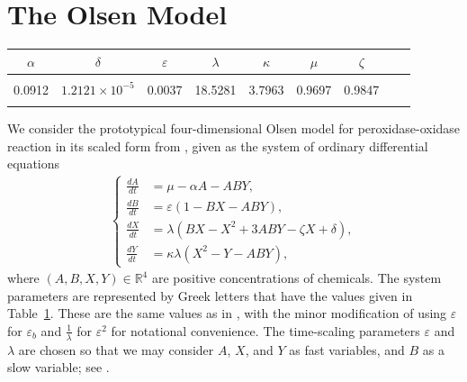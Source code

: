 \documentclass{ws-ijbc}
\begin{document}
\section{The Olsen Model}
\label{sec:olsen}
%
\begin{table}[t!]
{\begin{tabular}{c  c  c  c  c  c  c  c  c} \\[-2pt]
\toprule
$\alpha$ & $\delta$ & $\varepsilon$ & $\lambda$ & $\kappa$ & $\mu$ & $\zeta$ \\[6pt]
\hline\\[-6pt]
0.0912 & $1.2121 \times 10^{-5}$ & 0.0037 & 18.5281 & 3.7963 & 0.9697 & 0.9847\\[1pt]
\botrule
\end{tabular}}
\label{table:pars}
\end{table}
 
We consider the prototypical four-dimensional Olsen model for peroxidase-oxidase reaction \cite{Olsen} in its scaled form from \cite{Rescaling}, given as the system of ordinary differential equations
%
\begin{equation}
\begin{aligned}
\begin{cases}
\frac{dA}{dt} &= \mu - \alpha A - ABY, \\[1mm]
\frac{dB}{dt} &= \varepsilon(1-BX - ABY), \\[1mm]
\frac{dX}{dt} &= \lambda(BX - X^2 +3ABY - \zeta X + \delta), \\[1mm]
\frac{dY}{dt} &= \kappa\lambda(X^2 - Y - ABY),
\end{cases}
\end{aligned}
\label{equation_1}
\end{equation}
%
where $(A, B, X, Y)\in\mathbb{R}^{4}$ are positive concentrations of chemicals.  The system parameters are represented by Greek letters that have the values given in Table~\ref{table:pars}.  These are the same values as in \cite{Rescaling}, with the minor modification of using $\varepsilon$ for $\varepsilon_{b}$ and $\frac{1}{\lambda}$ for $\varepsilon^{2}$ for notational convenience.  The time-scaling parameters $\varepsilon$ and $\lambda$ are chosen so that we may consider $A$, $X$, and $Y$ as fast variables, and $B$ as a slow variable; see \cite{Rescaling}.
\end{document}
